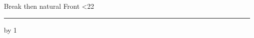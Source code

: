 \documentclass{pnpcards}
\begin{document}
\begin{card}{Break then natural}
Front\newpage
{}
\loop\ifnum\PageLimitLine<22
    \rule{1pt}{6mm}\par
    \advance\PageLimitLine by 1
\repeat
\end{card}
\end{document}
